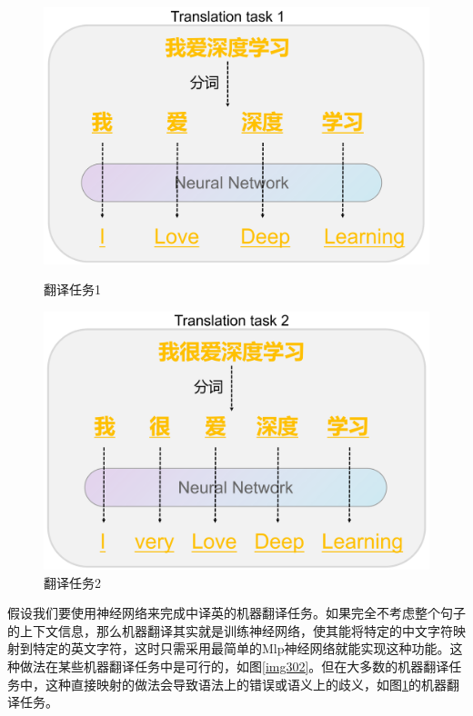 \begin{figure}[h]
	\begin{minipage}[t]{0.5\linewidth}
		\centering
		\includegraphics[scale=0.25]{image/chap03/img302.png}
		\caption{翻译任务1}
		\label{img302}
	\end{minipage}%
	\begin{minipage}[t]{0.5\linewidth}
		\centering
		\includegraphics[scale=0.25]{image/chap03/img303.png}
		\caption{翻译任务2}
		\label{img303}
	\end{minipage}
\end{figure}

假设我们要使用神经网络来完成中译英的机器翻译任务。如果完全不考虑整个句子的上下文信息，那么机器翻译其实就是训练神经网络，使其能将特定的中文字符映射到特定的英文字符，这时只需采用最简单的Mlp神经网络就能实现这种功能。这种做法在某些机器翻译任务中是可行的，如图\ref{img302}。但在大多数的机器翻译任务中，这种直接映射的做法会导致语法上的错误或语义上的歧义，如图\ref{img303}的机器翻译任务。

